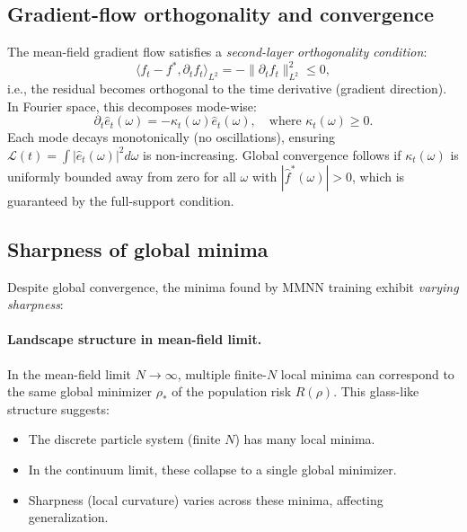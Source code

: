 \documentclass{article}
\begin{document}
\subsection{Gradient-flow orthogonality and convergence}
The mean-field gradient flow satisfies a \emph{second-layer orthogonality condition}:
\[
\langle f_t - f^*, \partial_t f_t \rangle_{L^2} = -\|\partial_t f_t\|^2_{L^2} \leq 0,
\]
i.e., the residual becomes orthogonal to the time derivative (gradient direction). In Fourier space, this decomposes mode-wise:
\[
\partial_t \hat{e}_t(\omega) = -\kappa_t(\omega) \hat{e}_t(\omega), \quad \text{where } \kappa_t(\omega) \geq 0.
\]
Each mode decays monotonically (no oscillations), ensuring \( \mathcal{L}(t) = \int |\hat{e}_t(\omega)|^2 d\omega \) is non-increasing. Global convergence follows if \( \kappa_t(\omega) \) is uniformly bounded away from zero for all \( \omega \) with \( |\hat{f}^*(\omega)| > 0 \), which is guaranteed by the full-support condition.

\vspace{1em}
\subsection{Sharpness of global minima}
Despite global convergence, the minima found by MMNN training exhibit \emph{varying sharpness}:

\paragraph{Landscape structure in mean-field limit.}
In the mean-field limit \( N \to \infty \), multiple finite-\( N \) local minima can correspond to the same global minimizer \( \rho_* \) of the population risk \( R(\rho) \). This glass-like structure suggests:
\begin{itemize}
    \item The discrete particle system (finite \( N \)) has many local minima.
    \item In the continuum limit, these collapse to a single global minimizer.
    \item Sharpness (local curvature) varies across these minima, affecting generalization.
\end{itemize}
\end{document}

